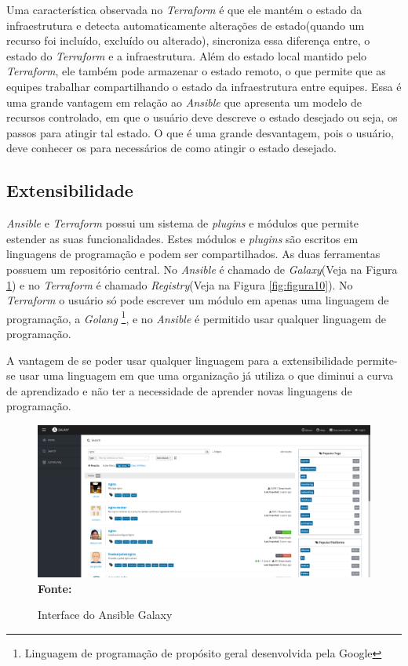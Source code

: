 Uma característica observada no \textit{Terraform} é que ele mantém o estado da infraestrutura e detecta automaticamente alterações de estado(quando um recurso foi incluído, excluído ou alterado), sincroniza essa diferença entre, o estado do \textit{Terraform} e a infraestrutura. Além do estado local mantido pelo \textit{Terraform}, ele também pode armazenar o estado remoto, o que permite que as equipes trabalhar compartilhando o estado da infraestrutura entre equipes. Essa é uma grande vantagem em relação ao \textit{Ansible} que apresenta um modelo de recursos controlado, em que o usuário deve descreve o estado desejado ou seja, os passos para atingir tal estado. O que é uma grande desvantagem, pois o usuário, deve conhecer os para necessários de como atingir o estado desejado. 


\subsection{Extensibilidade}

\textit{Ansible} e \textit{Terraform} possui um sistema de \textit{plugins} e módulos que permite estender as suas funcionalidades. Estes módulos e \textit{plugins} são escritos em linguagens de programação e podem ser compartilhados. As duas ferramentas possuem um repositório central. No \textit{Ansible} é chamado de \textit{Galaxy}(Veja na Figura \ref{fig:figura9}) e no \textit{Terraform} é chamado \textit{Registry}(Veja na Figura \ref{fig:figura10}). No \textit{Terraform} o usuário só pode escrever um módulo em apenas uma linguagem de programação, a \textit{Golang}  \footnote{Linguagem de programação de propósito geral desenvolvida pela Google}, e no \textit{Ansible} é permitido usar qualquer linguagem de programação.  

A vantagem de se poder usar qualquer linguagem para a extensibilidade permite-se usar uma linguagem em que uma organização já utiliza o que diminui a curva de aprendizado e não ter a necessidade de aprender novas linguagens de programação.

\begin{figure}[H]
	\centering	
	\caption[\hspace{0.1cm} Interface do Ansible Galaxy]{Interface do Ansible Galaxy}
	\vspace{-0.4cm}
	\includegraphics[width=1.0\textwidth]{artigo/figuras/galaxy_2.png}
	 \vspace{-0.2cm}
	\\\textbf{\footnotesize Fonte: \cite{ansible_galaxy}}
	\label{fig:figura9}
\end{figure}
\vspace{-0.5cm}

